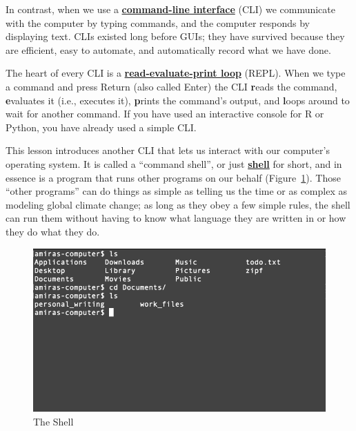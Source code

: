 \documentclass[
]{krantz}
\newcommand{\gref}[2]{\hyperlink{#2}{\textbf{#1}}}
\begin{document}
In contrast,
when we use a \gref{command-line interface}{cli} (CLI)
we communicate with the computer by typing commands,
and the computer responds by displaying text.
CLIs existed long before GUIs;
they have survived because they are efficient,
easy to automate,
and automatically record what we have done.

The heart of every CLI is a \gref{read-evaluate-print loop}{repl} (REPL).
When we type a command and press Return (also called Enter)
the CLI \textbf{r}eads the command,
\textbf{e}valuates it (i.e., executes it),
\textbf{p}rints the command's output,
and \textbf{l}oops around to wait for another command.
If you have used an interactive console for R or Python,
you have already used a simple CLI.

This lesson introduces another CLI that lets us interact with our computer's operating system.
It is called a ``command shell'',
or just \gref{shell}{shell} for short,
and in essence is a program that runs other programs on our behalf
(Figure~\ref{fig:bash-basics-repl}).
Those ``other programs'' can do things as simple as telling us the time
or as complex as modeling global climate change;
as long as they obey a few simple rules,
the shell can run them without having to know what language they are written in
or how they do what they do.

\begin{figure}

{\centering \includegraphics[width=1\linewidth]{figures/bash-basics/the-shell} 

}

\caption{The Shell}\label{fig:bash-basics-repl}
\end{figure}
\end{document}
